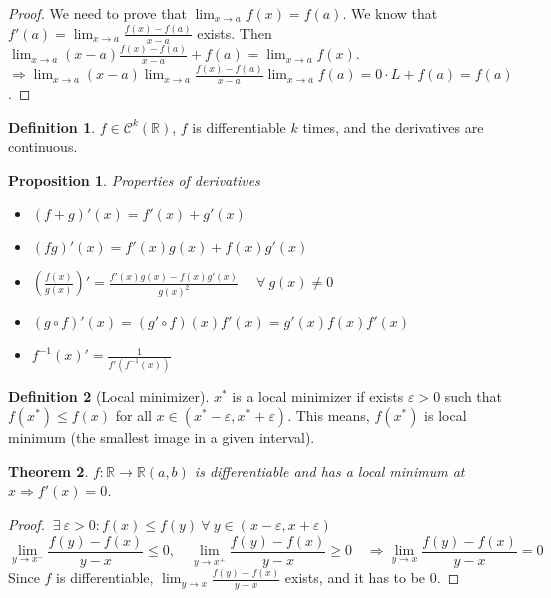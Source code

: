 \documentclass{article}
\newcommand{\DS}{\displaystyle}
\newcommand{\Ar}{\Rightarrow}
\newcommand{\fOnR}[1]{#1 : \mathbb{R} \rightarrow \mathbb{R}}
\newcommand{\intoo}[1]{\left(#1\right)}
\newcommand{\limx}[1]{\lim_{x \to #1}}
\theoremstyle{definition}
\newtheorem{definition}{Definition}[section]
\theoremstyle{definition}
\theoremstyle{plain}
\newtheorem{theorem}{Theorem}[section]
\theoremstyle{plain}
\theoremstyle{plain}
\theoremstyle{plain}
\newtheorem{proposition}[theorem]{Proposition}
\theoremstyle{definition}
\theoremstyle{remark}
\theoremstyle{remark}
\theoremstyle{remark}
\theoremstyle{remark}
\newcommand{\R}{\mathbb{R}}
\newcommand{\ForAll}{\ \forall \ }
\newcommand{\Exists}{\ \exists \ }
\newcommand{\E}{\varepsilon}
\begin{document}
\begin{proof}
  We need to prove that $\DS \limx{a} f(x) = f(a)$. We know that $f'(a) = \limx{a} \frac{f(x)-f(a)}{x-a}$ exists. Then $\DS \limx{a} (x-a) \frac{f(x)-f(a)}{x-a} + f(a) = \limx{a} f(x)$. $\DS \Ar \limx{a}(x-a) \limx{a} \frac{f(x)-f(a)}{x-a} \limx{a}f(a) = 0 \cdot L + f(a) = f(a)$.
\end{proof}


\begin{definition}
  $f \in \mathcal{C}^k(\R)$, $f$ is differentiable $k$ times, and the derivatives are continuous.
\end{definition}


\begin{proposition}
  Properties of derivatives
  \begin{itemize}
  \item $(f + g)'(x) = f'(x) + g'(x)$
  \item $(fg)'(x) = f'(x)g(x) + f(x)g'(x)$
  \item $(\frac{f(x)}{g(x)})' = \frac{f'(x)g(x)-f(x)g'(x)}{g(x)^2} \quad \ForAll g(x) \neq 0$
  \item $(g \circ f)'(x) = (g' \circ f)(x)f'(x) = g'(x)f(x)f'(x)$
  \item $f^{-1}(x)' = \frac{1}{f'(f^{-1}(x))}$
  \end{itemize}
\end{proposition}



\begin{definition}[Local minimizer]
  $x^*$ is a local minimizer if exists $\E > 0$ such that $f(x^*) \leq f(x)$ for all $x \in \intoo{x^*-\E, x^*+\E}$. This means, $f(x^*)$ is local minimum (the smallest image in a given interval).
\end{definition}


\begin{theorem}
  $\fOnR{f}{\intoo{a,b}}$ is differentiable and has a local minimum at $x \Ar f'(x) = 0$.
\end{theorem}

\begin{proof}
  $\Exists \E > 0 : f(x) \leq f(y) \ForAll y \in \intoo{x-\E,x+\E}$
  \[
  \lim_{y \to x^-} \frac{f(y)-f(x)}{y-x} \leq 0, \quad
  \lim_{y \to x^+} \frac{f(y)-f(x)}{y-x} \geq 0 \quad \Ar
  \lim_{y \to x} \frac{f(y)-f(x)}{y-x} = 0
  \]
  Since $f$ is differentiable, $\DS \lim_{y \to x}\frac{f(y)-f(x)}{y-x}$ exists, and it has to be 0.
\end{proof}
\end{document}
